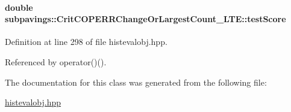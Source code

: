 \hypertarget{classsubpavings_1_1CritCOPERRChangeOrLargestCount__LTE_acd8afac0f7fca3d0b95f245e0baeab8e}{
\paragraph[{test\-Score}]{\setlength{\rightskip}{0pt plus 5cm}double {\bf subpavings\-::\-Crit\-C\-O\-P\-E\-R\-R\-Change\-Or\-Largest\-Count\-\_\-\-L\-T\-E\-::test\-Score}}}\label{classsubpavings_1_1CritCOPERRChangeOrLargestCount__LTE_acd8afac0f7fca3d0b95f245e0baeab8e}


\-Definition at line 298 of file histevalobj.\-hpp.



\-Referenced by operator()().



\-The documentation for this class was generated from the following file\-:\begin{DoxyCompactItemize}
\item 
\hyperlink{histevalobj_8hpp}{histevalobj.\-hpp}\end{DoxyCompactItemize}
